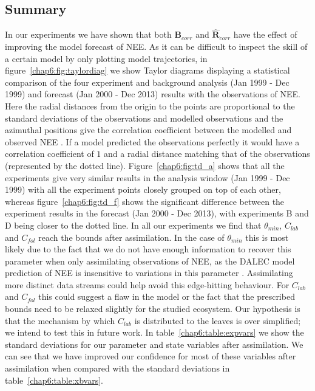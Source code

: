 \subsection{Summary}

In our experiments we have shown that both $\textbf{B}_{corr}$ and $\hat{\textbf{R}}_{corr}$ have the effect of improving the model forecast of NEE. As it can be difficult to inspect the skill of a certain model by only plotting model trajectories, in figure~\ref{chap6:fig:taylordiag} we show Taylor diagrams displaying a statistical comparison of the four experiment and background analysis (Jan 1999 - Dec 1999) and forecast (Jan 2000 - Dec 2013) results with the observations of NEE. Here the radial distances from the origin to the points are proportional to the standard deviations of the observations and modelled observations and the azimuthal positions give the correlation coefficient between the modelled and observed NEE \citep{Taylor2001}. If a model predicted the observations perfectly it would have a correlation coefficient of $1$ and a radial distance matching that of the observations (represented by the dotted line). Figure~\ref{chap6:fig:td_a} shows that all the experiments give very similar results in the analysis window (Jan 1999 - Dec 1999) with all the experiment points closely grouped on top of each other, whereas figure~\ref{chap6:fig:td_f} shows the significant difference between the experiment results in the forecast (Jan 2000 - Dec 2013), with experiments B and D being closer to the dotted line. In all our experiments we find that $\theta_{min}$, $C_{lab}$ and $C_{fol}$ reach the bounds after assimilation. In the case of $\theta_{min}$ this is most likely due to the fact that we do not have enough information to recover this parameter when only assimilating observations of NEE, as the DALEC model prediction of NEE is insensitive to variations in this parameter \citep{Ann2013}. Assimilating more distinct data streams could help avoid this edge-hitting behaviour. For $C_{lab}$ and $C_{fol}$ this could suggest a flaw in the model or the fact that the prescribed bounds need to be relaxed slightly for the studied ecosystem. Our hypothesis is that the mechanism by which $C_{lab}$ is distributed to the leaves is over simplified; we intend to test this in future work. In table~\ref{chap6:table:expvars} we show the standard deviations for our parameter and state variables after assimilation. We can see that we have improved our confidence for most of these variables after assimilation when compared with the standard deviations in table~\ref{chap6:table:xbvars}.

